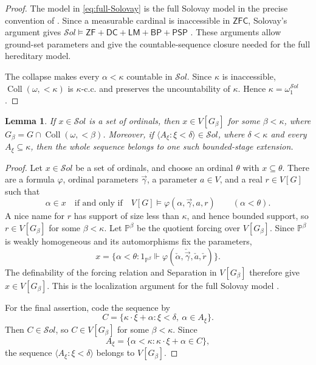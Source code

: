 \documentclass[11pt,a4paper]{amsart}
\newcommand{\ZF}{\mathsf{ZF}}
\newcommand{\ZFC}{\mathsf{ZFC}}
\newcommand{\Coll}{\operatorname{Coll}}
\newcommand{\DC}{\mathsf{DC}}
\newcommand{\LM}{\mathsf{LM}}
\newcommand{\BP}{\mathsf{BP}}
\newcommand{\PSP}{\mathsf{PSP}}
\theoremstyle{plain}
\newtheorem{lemma}[theorem]{Lemma}
\theoremstyle{definition}
\theoremstyle{remark}
\begin{document}
\begin{proof}
The model in \eqref{eq:full-Solovay} is the full Solovay model in the precise convention of \cite[Definition~4 and the following paragraph]{SakaiTanno}.  Since a measurable cardinal is inaccessible in $\ZFC$, Solovay's argument gives
$\mathcal S\!ol\models\ZF+\DC+\LM+\BP+\PSP$ \cite[III, Sections~1.3--1.11 and~2.4--2.11]{Solovay}.  These arguments allow ground-set parameters and give the countable-sequence closure needed for the full hereditary model.

The collapse makes every $\alpha<\kappa$ countable in $\mathcal S\!ol$.  Since $\kappa$ is inaccessible, ${\Coll}(\omega,{<}\kappa)$ is $\kappa$-c.c. and preserves the uncountability of $\kappa$.  Hence $\kappa=\omega_1^{\mathcal S\!ol}$.
\end{proof}

\begin{lemma}\label{lem:Solovay-localization}
If $x\in\mathcal S\!ol$ is a set of ordinals, then
$x\in V[G_\beta]$ for some $\beta<\kappa$, where
$G_\beta=G\cap{\Coll}(\omega,{<}\beta)$.  Moreover, if
$\langle A_\xi:\xi<\delta\rangle\in\mathcal S\!ol$, where
$\delta<\kappa$ and every $A_\xi\subseteq\kappa$, then the whole sequence belongs to one such bounded-stage extension.
\end{lemma}

\begin{proof}
Let $x\in\mathcal S\!ol$ be a set of ordinals, and choose an ordinal $\theta$ with $x\subseteq\theta$.  There are a formula $\varphi$, ordinal parameters $\vec\gamma$, a parameter $a\in V$, and a real $r\in V[G]$ such that
\[
\alpha\in x\quad\text{if and only if}\quad
V[G]\models\varphi(\alpha,\vec\gamma,a,r)
\qquad(\alpha<\theta).
\]
A nice name for $r$ has support of size less than $\kappa$, and hence bounded support, so $r\in V[G_\beta]$ for some $\beta<\kappa$.  Let $\mathbb P^\beta$ be the quotient forcing over $V[G_\beta]$.  Since $\mathbb P^\beta$ is weakly homogeneous and its automorphisms fix the parameters,
\[
x=\{\alpha<\theta:
1_{\mathbb P^\beta}\Vdash
\varphi(\check\alpha,\check{\vec\gamma},\check a,\check r)\}.
\]
The definability of the forcing relation and Separation in $V[G_\beta]$ therefore give $x\in V[G_\beta]$.  This is the localization argument for the full Solovay model \cite[Definition~4, Fact~5, and the paragraph following Fact~5]{SakaiTanno}.

For the final assertion, code the sequence by
\[
C=\{\kappa\cdot\xi+\alpha:\xi<\delta,\ \alpha\in A_\xi\}.
\]
Then $C\in\mathcal S\!ol$, so $C\in V[G_\beta]$ for some $\beta<\kappa$.  Since
\[
A_\xi=\{\alpha<\kappa:\kappa\cdot\xi+\alpha\in C\},
\]
the sequence $\langle A_\xi:\xi<\delta\rangle$ belongs to $V[G_\beta]$.
\end{proof}
\end{document}

